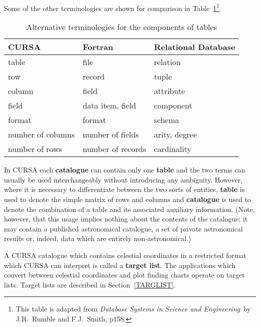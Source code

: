 \documentclass[twoside,11pt]{article}
\renewcommand{\_}{\texttt{\symbol{95}}}
\begin{document}
Some of the other terminologies are shown for comparison in
Table~\ref{TABLE_NOT}\footnote{This table is adapted from {\it
Database Systems in Science and Engineering}\, by J.R.~Rumble and
F.J.~Smith\cite{RUMBLE}, p158.}.

\begin{table}[htbp]

\begin{center}
\begin{tabular}{lll}
CURSA             &  Fortran           &  Relational Database \\ \hline
table             &  file              &  relation      \\
row               &  record            &  tuple         \\
column            &  field             &  attribute     \\
field             &  data item, field  &  component     \\
format            &  format            &  schema        \\
number of columns &  number of fields  &  arity, degree \\
number of rows    &  number of records &  cardinality   \\
\end{tabular}
\end{center}

\caption{Alternative terminologies for the components of tables
\label{TABLE_NOT} }

\end{table}

In CURSA each {\bf catalogue} can contain only one {\bf
table} and the two terms can usually be used interchangeably without
introducing any ambiguity. However, where it is necessary to
differentiate between the two sorts of entities, {\bf table} is used
to denote the simple matrix of rows and columns and {\bf catalogue} is
used to denote the combination of a table and its associated auxiliary
information. (Note, however, that this usage implies nothing about the
contents of the catalogue; it may contain a published astronomical catalogue,
a set of private astronomical results or, indeed, data which are entirely
non-astronomical.)

A CURSA catalogue which contains celestial coordinates in a restricted
format which CURSA can interpret is called a {\bf target list}.  The
applications which convert between celestial coordinates and plot
finding charts operate on target lists.  Target lists are described in
Section~\ref{TARGLIST}.
\end{document}
